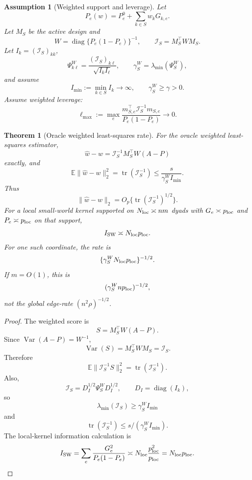 \documentclass[12pt]{article}
\newtheorem{theorem}{Theorem}
\newtheorem{assumption}{Assumption}
\newcommand{\1}{\mathbf{1}}
\DeclareMathOperator{\diag}{diag}
\DeclareMathOperator{\tr}{tr}
\providecommand{\Var}{\operatorname{Var}}
\providecommand{\Eb}{\mathbb E}
\providecommand{\calI}{\mathcal I}
\begin{document}
\begin{assumption}[Weighted support and leverage]\label{ass:weighted-support-final2}
Let
\[
  P_e(w)=P^0_e+\sum_{k\in S}w_kG_{k,e}.
\]
Let \(M_S\) be the active design and
\[
  W=\diag\{P_e(1-P_e)\}^{-1},
  \qquad
  \calI_S=M_S^\top W M_S .
\]
Let \(I_k=(\calI_S)_{kk}\),
\[
  \Psi^W_{k\ell}
  =
  \frac{(\calI_S)_{k\ell}}{\sqrt{I_kI_\ell}},
  \qquad
  \gamma_S^W=\lambda_{\min}(\Psi_S^W),
\]
and assume
\[
  I_{\min}:=\min_{k\in S}I_k\to\infty,
  \qquad
  \gamma_S^W\ge\gamma>0.
\]
Assume weighted leverage:
\[
  \ell_{\max}:=
  \max_e
  \frac{
    m_{S,e}^\top\calI_S^{-1}m_{S,e}
  }{
    P_e(1-P_e)
  }
  \to0.
\]
\end{assumption}

\begin{theorem}[Oracle weighted least-squares rate]
\label{thm:weighted-support-upper-final2}
For the oracle weighted least-squares estimator,
\[
  \widehat w-w
  =
  \calI_S^{-1}M_S^\top W(A-P)
\]
exactly, and
\[
  \Eb\|\widehat w-w\|_2^2
  =
  \tr(\calI_S^{-1})
  \le
  \frac{s}{\gamma_S^WI_{\min}}.
\]
Thus
\[
  \|\widehat w-w\|_2
  =
  O_p\{\tr(\calI_S^{-1})^{1/2}\}.
\]
For a local small-world kernel supported on \(N_{\rm loc}\asymp nm\)
dyads with \(G_e\asymp p_{\rm loc}\) and \(P_e\asymp p_{\rm loc}\) on
that support,
\[
  I_{\rm SW}
  \asymp
  N_{\rm loc}p_{\rm loc}.
\]
For one such coordinate, the rate is
\[
  \{\gamma_S^WN_{\rm loc}p_{\rm loc}\}^{-1/2}.
\]
If \(m=O(1)\), this is
\[
  (\gamma_S^Wnp_{\rm loc})^{-1/2},
\]
not the global edge-rate \((n^2\rho)^{-1/2}\).
\end{theorem}

\begin{proof}
The weighted score is
\[
  S=M_S^\top W(A-P).
\]
Since \(\Var(A-P)=W^{-1}\),
\[
  \Var(S)=M_S^\top W M_S=\calI_S.
\]
Therefore
\[
  \Eb\|\calI_S^{-1}S\|_2^2
  =
  \tr(\calI_S^{-1}).
\]
Also,
\[
  \calI_S=D_I^{1/2}\Psi_S^WD_I^{1/2},
  \qquad
  D_I=\diag(I_k),
\]
so
\[
  \lambda_{\min}(\calI_S)\ge\gamma_S^WI_{\min}
\]
and
\[
  \tr(\calI_S^{-1})\le s/(\gamma_S^WI_{\min}).
\]
The local-kernel information calculation is
\[
  I_{\rm SW}
  =
  \sum_e\frac{G_e^2}{P_e(1-P_e)}
  \asymp
  N_{\rm loc}\frac{p_{\rm loc}^2}{p_{\rm loc}}
  =
  N_{\rm loc}p_{\rm loc}.
\]
\end{proof}
\end{document}
